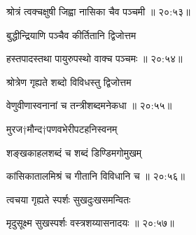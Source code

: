 
{\devanagarifont श्रोत्रं त्वक्चक्षुषी जिह्वा नासिका चैव पञ्चमी {॥ २०:५३॥} \veg\dontdisplaylinenum }%

{\devanagarifont बुद्धीन्द्रियाणि पञ्चैव कीर्तितानि द्विजोत्तम \thinspace{\dandab} \dontdisplaylinenum }%
 

{\devanagarifont हस्तपादस्तथा पायुरुपस्थो वाक्च पञ्चमः {॥ २०:५४॥} \veg\dontdisplaylinenum }%



{\devanagarifont श्रोत्रेण गृह्यते शब्दो विविधस्तु द्विजोत्तम \thinspace{\dandab} \dontdisplaylinenum }%
 

{\devanagarifont वेणुवीणास्वनानां च तन्त्रीशब्दमनेकधा {॥ २०:५५॥} \veg\dontdisplaylinenum }%
 
{\devanagarifont मुरज†मौन्द†पणवभेरीपटहनिस्वनम् \thinspace{\dandab} \dontdisplaylinenum }%

{\devanagarifont शङ्खकाहलशब्दं च शब्दं डिण्डिमगोमुखम्  \danda\dontdisplaylinenum }%
 

{\devanagarifont कांसिकातालमिश्रं च गीतानि विविधानि च {॥ २०:५६॥} \veg\dontdisplaylinenum }%



{\devanagarifont त्वचया गृह्यते स्पर्शः सुखदुःखसमन्वितः \thinspace{\dandab} \dontdisplaylinenum }%


{\devanagarifont मृदुसूक्ष्म सुखस्पर्शः वस्त्रशय्यासनादयः {॥ २०:५७॥} \veg\dontdisplaylinenum }%

